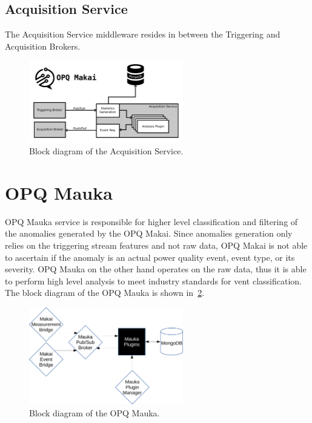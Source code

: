 \subsection{Acquisition Service}\label{subsec:acquisition-service}

The Acquisition Service middleware resides in between the Triggering and Acquisition Brokers.

\begin{figure}[h]
	\begin{center}
		\includegraphics[width=0.6\textwidth]{img/makai_aqs.pdf}
	\end{center}
	\caption{Block diagram of the Acquisition Service.}
	\label{fig:opq:makai_aqs}
\end{figure}

\section{OPQ Mauka}\label{sec:opq-mauka}
OPQ Mauka service is responsible for higher level classification and filtering of the anomalies generated by the OPQ Makai.
Since anomalies generation only
relies on the triggering stream features and not raw data, OPQ Makai is not able to ascertain if the anomaly is an actual power quality event, event type, or its severity.
OPQ Mauka on the other hand operates on the raw data, thus it is able to perform high level analysis to meet industry standards for vent classification.
The block diagram of the OPQ Mauka is shown in~\ref{fig:opq:11}.
\begin{figure}[h]
  \begin{center}
  \includegraphics[width=0.6\textwidth]{img/mauka.pdf}
  \end{center}
  \caption{Block diagram of the OPQ Mauka.}
  \label{fig:opq:11}
\end{figure}

